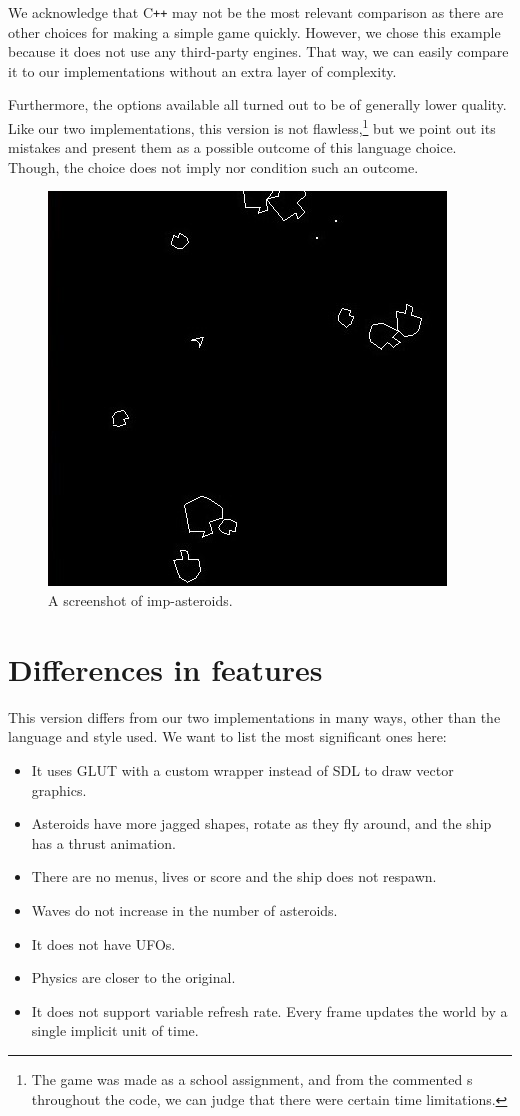 \documentclass[
  digital, %
  color,   %
  table,   %
  oneside, %
  lof,     %
  lot,     %
]{fithesis3}
\newcommand{\cpp}{C\nolinebreak\texttt{+}\nolinebreak\texttt{+}}
\begin{document}
{We acknowledge that \cpp{} may not be the most relevant comparison
as there are other choices for making a simple game quickly.
However, we chose this example because it does not use any third-party engines.
That way, we can easily compare it to our implementations
without an extra layer of complexity.

Furthermore, the options available all turned out to be of generally lower quality.
Like our two implementations, this version is not flawless,\footnote{
The game was made as a school assignment, and from the commented s
throughout the code, we can judge that there were certain time limitations.}
but we point out its mistakes and present them as a possible outcome of this language choice.
Though, the choice does not imply nor condition such an outcome.
\begin{figure}[H]
    \centering
    \includegraphics[width=0.5 \textwidth]{images/imperative-asteroids.jpg}
    \caption{A screenshot of imp-asteroids.}
    \label{fig:impscreenshot}
\end{figure}


\pagebreak
\section{Differences in features}

This version differs from our two implementations in many ways,
other than the language and style used. We want to list the most significant ones here:
\begin{itemize}[--]
    \item It uses GLUT with a custom wrapper instead of SDL to draw vector graphics.
    \item Asteroids have more jagged shapes, rotate as they fly around,
    and the ship has a thrust animation.
    \item There are no menus, lives or score and the ship does not respawn.
    \item Waves do not increase in the number of asteroids.
    \item It does not have UFOs.
    \item Physics are closer to the original.
    \item It does not support variable refresh rate.
    Every frame updates the world by a single implicit unit of time.
\end{itemize}


}
\end{document}
